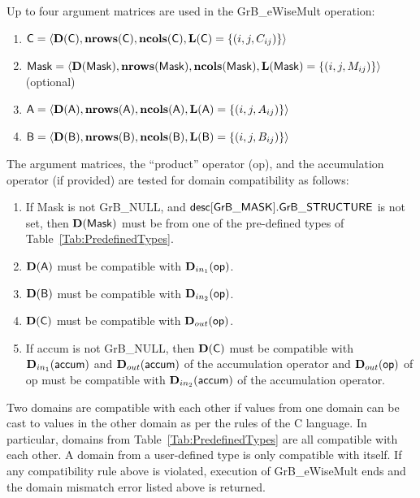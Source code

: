 Up to four argument matrices are used in the {\sf GrB\_eWiseMult} operation:
\begin{enumerate}
	\item ${\sf C} = \langle \bold{D}({\sf C}),\bold{nrows}({\sf C}),
    \bold{ncols}({\sf C}),\bold{L}({\sf C}) = \{(i,j,C_{ij}) \} \rangle$

	\item ${\sf Mask} = \langle \bold{D}({\sf Mask}),\bold{nrows}({\sf Mask}),
    \bold{ncols}({\sf Mask}),\bold{L}({\sf Mask}) = \{(i,j,M_{ij}) \} \rangle$ (optional)

	\item ${\sf A} = \langle \bold{D}({\sf A}),\bold{nrows}({\sf A}),
    \bold{ncols}({\sf A}),\bold{L}({\sf A}) = \{(i,j,A_{ij}) \} \rangle$

	\item ${\sf B} = \langle \bold{D}({\sf B}),\bold{nrows}({\sf B}),
    \bold{ncols}({\sf B}),\bold{L}({\sf B}) = \{(i,j,B_{ij}) \} \rangle$
\end{enumerate}

The argument matrices, the ``product'' operator ({\sf op}), and the accumulation 
operator (if provided) are tested for domain compatibility as follows:
\begin{enumerate}
	\item If {\sf Mask} is not {\sf GrB\_NULL}, and ${\sf desc[GrB\_MASK].GrB\_STRUCTURE}$
    is not set, then $\bold{D}({\sf Mask})$ must be from one of the pre-defined types of 
    Table~\ref{Tab:PredefinedTypes}.

	\item $\bold{D}({\sf A})$ must be compatible with $\mbox{$\mathbf{D}_{in_{1}}$}({\sf op})$.

	\item $\bold{D}({\sf B})$ must be compatible with $\mbox{$\mathbf{D}_{in_{2}}$}({\sf op})$.

	\item $\bold{D}({\sf C})$ must be compatible with $\mbox{$\mathbf{D}_{out}$}({\sf op})$.

	\item If {\sf accum} is not {\sf GrB\_NULL}, then $\bold{D}({\sf C})$ must be
    compatible with $\mbox{$\mathbf{D}_{in_{1}}$}({\sf accum})$ and $\mbox{$\mathbf{D}_{out}$}({\sf accum})$ of the accumulation operator and 
    $\mbox{$\mathbf{D}_{out}$}({\sf op})$ of {\sf op} must be compatible with $\mbox{$\mathbf{D}_{in_{2}}$}({\sf accum})$ of the accumulation operator.
\end{enumerate}
Two domains are compatible with each other if values from one domain can be cast 
to values in the other domain as per the rules of the C language.
In particular, domains from Table~\ref{Tab:PredefinedTypes} are all compatible 
with each other. A domain from a user-defined type is only compatible with itself.
If any compatibility rule above is violated, execution of {\sf GrB\_eWiseMult} ends and 
the domain mismatch error listed above is returned.

